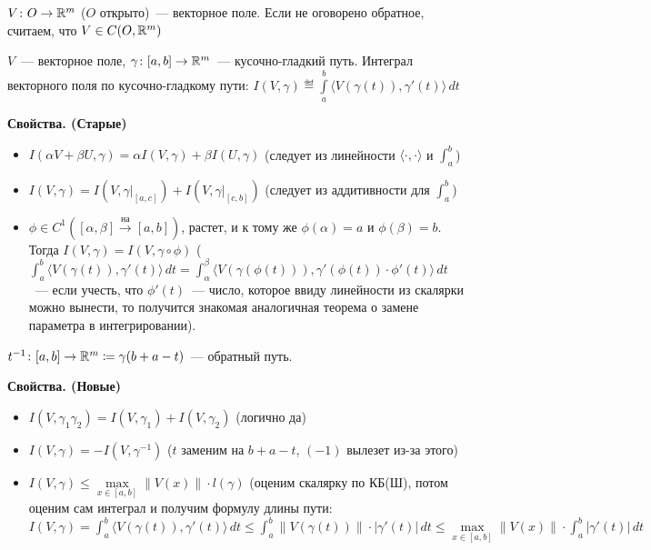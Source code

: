 
\begin{defin*}
    $V\colon O\to \mathbb{R}^{m}$ ($O$ открыто)~--- векторное поле. Если не оговорено обратное, считаем, что $V\in C(O,\mathbb{R}^{m})$
\end{defin*}

\begin{defin*}
    $V$~--- векторное поле, $\gamma\colon[a,b]\to\mathbb{R}^{m}$~--- кусочно-гладкий путь.
    Интеграл векторного поля по кусочно-гладкому пути:
    $I(V, \gamma)\eqdef\int\limits_a^b\langle V(\gamma(t)),\gamma'(t)\rangle\,dt$
\end{defin*}

{\textbf{Свойства. (Старые)}}
\begin{itemize}
	\item $I(\alpha V+\beta U,\gamma)=\alpha I(V,\gamma)+\beta I(U,\gamma)$ (следует из линейности $\langle\cdot,\cdot\rangle$ и $\int^b_a$) 
	\item $I(V,\gamma)=I(V,\gamma\vert_{[a,c]})+I(V,\gamma\vert_{[c,b]})$ (следует из аддитивности для $\int^b_a$)
	\item $\phi\in C^1([\alpha,\beta]\xrightarrow{на}[a,b])$, растет, и к тому же $\phi(\alpha)=a$ и $\phi(\beta)=b$. Тогда $I(V,\gamma)=I(V,\gamma\circ\phi)$
	($\int_a^b\langle V(\gamma(t)),\gamma'(t)\rangle\,dt = 
	\int_\alpha^\beta\langle V(\gamma(\phi(t))),\gamma'(\phi(t))\cdot\phi'(t)\rangle\,dt$~--- если учесть, что $\phi'(t)$~--- число, которое ввиду линейности из скалярки можно вынести, то получится знакомая аналогичная теорема о замене параметра в интегрировании).
\end{itemize}


\begin{defin*}
	$t^{-1}\colon[a,b]\to\mathbb{R}^{m}\coloneqq\gamma(b+a-t)$~--- обратный путь.
\end{defin*}

\textbf{Свойства. (Новые)}
\begin{itemize}
	\item $I(V,\gamma_1\gamma_2)=I(V,\gamma_1)+I(V,\gamma_2)$ (логично да)
	\item $I(V,\gamma)=-I(V,\gamma^{-1})$ ($t$ заменим на $b+a-t$, $(-1)$ вылезет из-за этого)
	\item $I(V,\gamma)\leqslant\max\limits_{x\in[a,b]}\|V(x)\|\cdot l(\gamma)$ (оценим скалярку по КБ(Ш), потом оценим сам интеграл и получим формулу длины пути:\\
	$I(V,\gamma)=\int_a^b\langle V(\gamma(t)),\gamma'(t)\rangle\,dt\leqslant\int_a^b\|V(\gamma(t))\|\cdot|\gamma'(t)|\,dt\leqslant\max\limits_{x\in[a,b]}\|V(x)\|\cdot\int_a^b|\gamma'(t)|\,dt$
\end{itemize}


